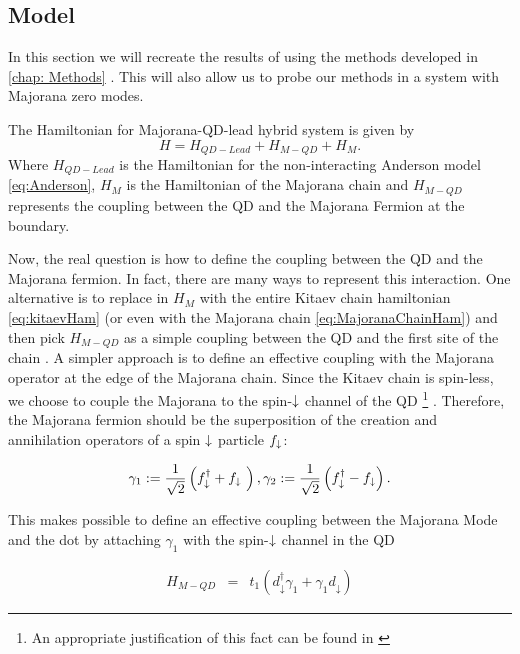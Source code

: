 \subsection{Model}


In this section we will recreate the results of \citeauthor{liu_detecting_2011} using the methods developed in \ref{chap: Methods} . This will also allow us to probe our methods in a system with Majorana zero modes. 

The Hamiltonian for Majorana-QD-lead hybrid system is  given by
\begin{equation}
    H=H_{QD-Lead}+H_{M-QD}+H_M.
\end{equation}
Where $H_{QD-Lead}$ is the Hamiltonian for the non-interacting Anderson model \eqref{eq:Anderson}, $H_M$ is the Hamiltonian of the Majorana chain and $H_{M-QD}$ represents the coupling between the QD and the Majorana Fermion at the boundary.

Now, the real question is how to define the coupling between the QD and the Majorana fermion. In fact, there are many ways to represent this interaction. One alternative is to replace in $H_{M}$ with the entire Kitaev chain hamiltonian \eqref{eq:kitaevHam} (or  even with the  Majorana chain \eqref{eq:MajoranaChainHam}) and then pick $H_{M-QD}$ as a simple coupling between the QD and the first site of the chain \cite{vernek_subtle_2014}.  A simpler approach is  to define an effective coupling with the Majorana operator at the edge of the Majorana chain. Since the Kitaev chain is spin-less, we choose to couple the Majorana to the spin-$\downarrow$ channel of the QD \footnote{An appropriate justification of this fact can be found in \cite{ruiz-tijerina_interaction_2015}} . Therefore, the Majorana fermion should be the superposition of the creation and annihilation operators of a spin $\downarrow$ particle $f_\downarrow$:

$$\gamma_1 := \frac{1}{\sqrt{2}} \left( f^\dagger_{\downarrow} + f_{\downarrow}\ \right) , \gamma_2 := \frac{1}{\sqrt{2}} \left( f^\dagger_{\downarrow} - f_{\downarrow} \right).$$

This makes possible to define an effective coupling between the Majorana Mode and the dot by attaching $\gamma_1$ with the spin-$\downarrow$ channel in the QD

\begin{eqnarray}
H_{M-QD} & = &  t_1 \left(d_{\downarrow}^{\dagger}\gamma_{1}+\gamma_{1}d_{\downarrow}\right) 
\label{eq:MajoranaCoupling}
\end{eqnarray}




